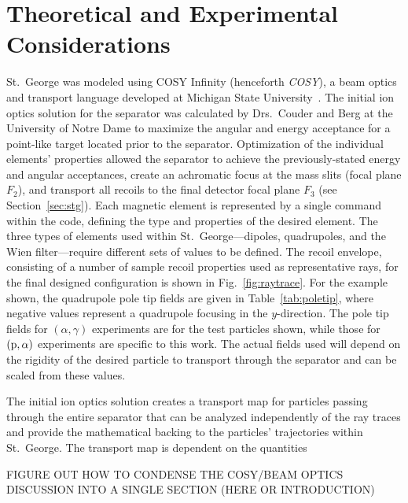 \section{Theoretical and Experimental Considerations}
\label{sec:cosy}


St.\ George was modeled using COSY Infinity (henceforth \emph{COSY}), a
beam optics and transport language developed at Michigan State
University~\cite{COSY}. The initial ion optics solution for the
separator was calculated by Drs.\ Couder and Berg at the University of
Notre Dame to maximize the angular and energy acceptance for a
point-like target located prior to the separator. Optimization of the
individual elements' properties allowed the separator to achieve the
previously-stated energy and angular acceptances, create an achromatic
focus at the mass slits (focal plane $F_2$), and transport all recoils
to the final detector focal plane $F_3$ (see Section~\ref{sec:stg}).
Each magnetic element is represented by a single command within the
code, defining the type and properties of the desired element. The three
types of elements used within St.\ George\----{}dipoles, quadrupoles,
and the Wien filter\----{}require different sets of values to be
defined. The recoil envelope, consisting of a number of sample recoil
properties used as representative rays, for the final designed
configuration is shown in Fig.~\ref{fig:raytrace}. For the example
shown, the quadrupole pole tip fields are given in
Table~\ref{tab:poletip}, where negative values represent a quadrupole
focusing in the $y$-direction. The pole tip fields for $(\alpha,\gamma)$
experiments are for the test particles shown, while those for $({\rm
p},\alpha)$ experiments are specific to this work. The actual fields
used will depend on the rigidity of the desired particle to transport
through the separator and can be scaled from these values.

The initial ion optics solution creates a transport map for particles
passing through the entire separator that can be analyzed independently
of the ray traces and provide the mathematical backing to the particles'
trajectories within St.\ George. The transport map is dependent on the
quantities

FIGURE OUT HOW TO CONDENSE THE COSY/BEAM OPTICS DISCUSSION INTO A SINGLE
SECTION (HERE OR INTRODUCTION)


